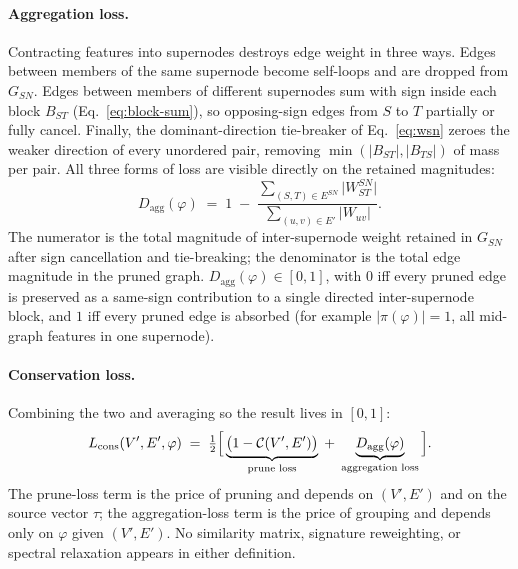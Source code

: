 \paragraph{Aggregation loss.}
Contracting features into supernodes destroys edge weight in three
ways. Edges between members of the same supernode become self-loops
and are dropped from $G_{SN}$. Edges between members of different
supernodes sum with sign inside each block $B_{ST}$
(Eq.~\eqref{eq:block-sum}), so opposing-sign edges from $S$ to $T$
partially or fully cancel. Finally, the dominant-direction tie-breaker
of Eq.~\eqref{eq:wsn} zeroes the weaker direction of every unordered
pair, removing $\min(|B_{ST}|, |B_{TS}|)$ of mass per pair. All three
forms of loss are visible directly on the retained magnitudes:
\begin{equation}
D_{\text{agg}}(\varphi)
\;=\;
1 \;-\;
\frac{\sum_{(S, T) \in E^{SN}} \lvert W^{SN}_{ST} \rvert}
     {\sum_{(u, v) \in E'} \lvert W_{uv} \rvert}.
\label{eq:Dagg}
\end{equation}
The numerator is the total magnitude of inter-supernode weight retained
in $G_{SN}$ after sign cancellation and tie-breaking; the denominator
is the total edge magnitude in the pruned graph.
$D_{\text{agg}}(\varphi) \in [0, 1]$, with $0$ iff every pruned edge is
preserved as a same-sign contribution to a single directed
inter-supernode block, and $1$ iff every pruned edge is absorbed (for
example $|\pi(\varphi)| = 1$, all mid-graph features in one supernode).

\paragraph{Conservation loss.}
Combining the two and averaging so the result lives in $[0, 1]$:
\begin{equation}
L_{\text{cons}}(V', E', \varphi)
\;=\;
\tfrac{1}{2}\Bigl[\,
\underbrace{\bigl(1 - \mathcal{C}(V', E')\bigr)}_{\text{prune loss}}
\;+\;
\underbrace{D_{\text{agg}}(\varphi)}_{\text{aggregation loss}}
\,\Bigr].
\label{eq:Lcons}
\end{equation}
The prune-loss term is the price of pruning and depends on $(V', E')$
and on the source vector $\tau$; the aggregation-loss term is the
price of grouping and depends only on $\varphi$ given $(V', E')$. No
similarity matrix, signature reweighting, or spectral relaxation
appears in either definition.

